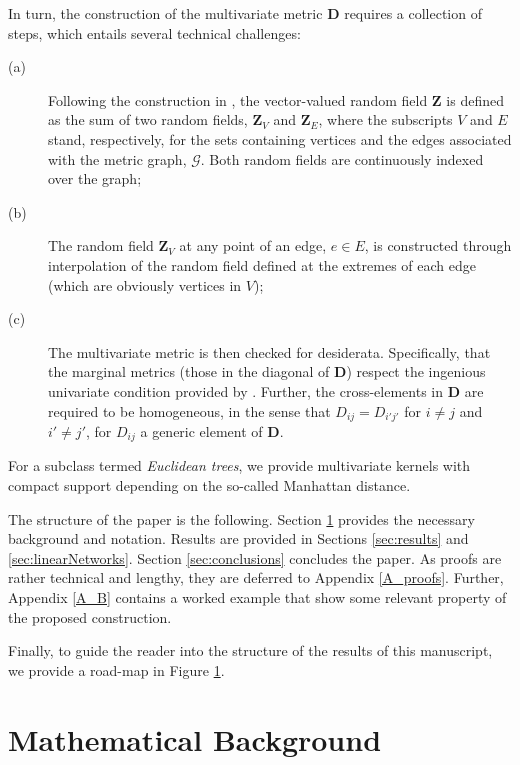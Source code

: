 \documentclass[12pt]{article}
\theoremstyle{plain}
\theoremstyle{remark}
\newcommand{\latMatr}[1]{\mathbf{#1}}          %
\newcommand{\tobi}[1]{\textcolor{teal}{#1}}
\begin{document}
    In turn, the construction of the multivariate metric $\latMatr D$ requires a collection of steps, which entails several technical challenges: 
    \begin{description}
        \item[(a)] Following the construction in \cite{anderes_isotropic_2020}, the vector-valued random field $\bm{Z}$ is defined as the sum of two random fields, $\bm{Z}_V$ and $\bm{Z}_E$, where the subscripts $V$ and $E$ stand, respectively, for the sets containing vertices and the edges associated with the metric graph, $\mathcal G$. Both {random fields} are continuously indexed over the graph;
        \item[(b)] The {random field} $\bm{Z}_V$ at any point of an edge, $e \in E$, is constructed through interpolation of the {random field} defined at the extremes of each edge (which are obviously vertices in $V$);
        \item[(c)] The multivariate metric is then checked for desiderata. Specifically, that the marginal metrics (those in the diagonal of $\latMatr{D}$) respect the ingenious univariate condition provided by \cite{anderes_isotropic_2020}. Further, the cross-elements in $\latMatr{D}$ are required to be homogeneous, in the sense that $D_{ij} = D_{i'j'}$ for $i \ne j $ and $i' \ne j'$, for $D_{ij}$ a generic element of $\latMatr{D}$.
    \end{description}
    For a subclass termed {\em Euclidean trees}, we provide multivariate kernels with compact support depending on the so-called Manhattan distance. \par 
    The structure of the paper is the following. Section \ref{sec:mathBackground} provides the necessary background and notation. Results are provided in Sections \ref{sec:results} and \ref{sec:linearNetworks}. Section \ref{sec:conclusions} concludes the paper. As proofs are rather technical and lengthy, they are deferred to Appendix \ref{A_proofs}. Further, Appendix \ref{A_B} contains a worked example that show some relevant property of the proposed construction. \par
    Finally, to guide the reader into the structure of the results of this manuscript, we provide a road-map in Figure \ref{fig:resultsRoadMap}.
    \begin{figure}[omitted: a diagram of this paper's results, not reproduced here]\label{fig:resultsRoadMap}\end{figure}%
\section{Mathematical Background} 
\label{sec:mathBackground}
\end{document}
